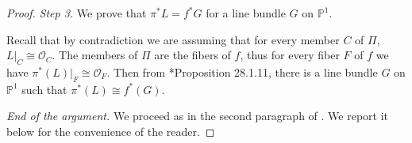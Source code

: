 \documentclass[11pt]{article} %
\theoremstyle{definition}
\begin{document}
\begin{proof}

\textit{Step 3.} We prove that $\pi^*L = f^* G$ for a line bundle $G$ on $\mathbb{P}^1.$


Recall that by contradiction we are assuming that for every member $C$ of $\Pi$, $L|_C\cong \mathcal{O}_C$. The members of $\Pi$ are the fibers of $f$, thus for every fiber $F$ of $f$ we have $\pi^*(L)|_F\cong \mathcal{O}_F$. Then from \cite{Vak17}*{Proposition 28.1.11}, there is a line bundle $G$ on $\mathbb{P}^1$ such that $\pi^*(L)\cong f^*(G)$.

\textit{End of the argument.}
We proceed as in the second paragraph of \cite{Sta16}. We report it below for the convenience of the reader. 


\end{proof}
\end{document}
